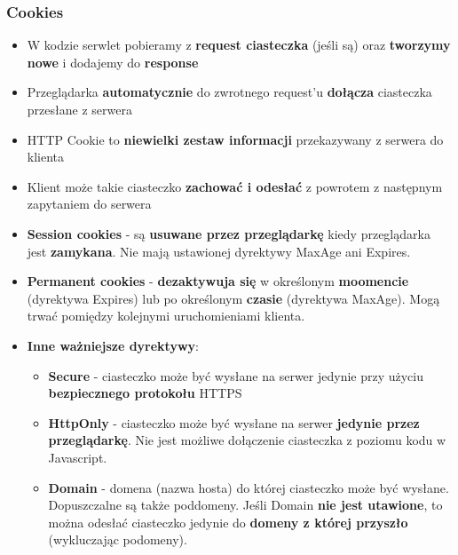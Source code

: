 \documentclass[../main.tex]{subfiles}
\begin{document}
    \subsubsection{Cookies}
    \begin{itemize}
        \item W kodzie serwlet pobieramy z \textbf{request ciasteczka} (jeśli są) oraz \textbf{tworzymy nowe} i dodajemy do \textbf{response}
        \item Przeglądarka \textbf{automatycznie} do zwrotnego request'u \textbf{dołącza} ciasteczka
        przesłane z serwera
        \item HTTP Cookie to \textbf{niewielki zestaw informacji} przekazywany z serwera do klienta
        \item Klient może takie ciasteczko \textbf{zachować i odesłać} z powrotem z następnym
        zapytaniem do serwera
        \item \textbf{Session cookies} - są \textbf{usuwane przez przeglądarkę} kiedy przeglądarka jest \textbf{zamykana}. Nie mają
        ustawionej dyrektywy MaxAge ani Expires.
        \item \textbf{Permanent cookies} - \textbf{dezaktywuja się} w określonym \textbf{moomencie} (dyrektywa Expires) lub po
        określonym \textbf{czasie} (dyrektywa MaxAge). Mogą trwać pomiędzy kolejnymi uruchomieniami klienta.\\

        \item \textbf{Inne ważniejsze dyrektywy}:
        \begin{itemize}
            \item \textbf{Secure} - ciasteczko może być wysłane na serwer jedynie przy użyciu \textbf{bezpiecznego
            protokołu} HTTPS
            \item \textbf{HttpOnly} - ciasteczko może być wysłane na serwer \textbf{jedynie przez przeglądarkę}. Nie jest
            możliwe dołączenie ciasteczka z poziomu kodu w Javascript.
            \item \textbf{Domain} - domena (nazwa hosta) do której ciasteczko może być wysłane.
            Dopuszczalne są także poddomeny. Jeśli Domain \textbf{nie jest utawione}, to można odesłać ciasteczko jedynie do
            \textbf{domeny z której przyszło} (wykluczając podomeny).
        \end{itemize}
    \end{itemize}
\end{document}
